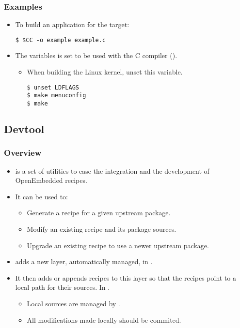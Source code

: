\begin{frame}[fragile]
  \frametitle{Examples}
  \begin{itemize}
    \item To build an application for the target:
      \begin{block}{}
        \begin{verbatim}
$ $CC -o example example.c
        \end{verbatim}
      \end{block}
    \item The  variables is set to be used with the C
      compiler ().
      \begin{itemize}
        \item When building the Linux kernel, unset this variable.
          \begin{block}{}
            \begin{verbatim}
$ unset LDFLAGS
$ make menuconfig
$ make
            \end{verbatim}
          \end{block}
      \end{itemize}
  \end{itemize}
\end{frame}

\subsection{Devtool}

\begin{frame}
  \frametitle{Overview}
  \begin{itemize}
    \item {} is a set of utilities to ease the integration
    and the development of OpenEmbedded recipes.
    \item It can be used to:
      \begin{itemize}
        \item Generate a recipe for a given upstream package.
        \item Modify an existing recipe and its package sources.
        \item Upgrade an existing recipe to use a newer upstream
          package.
      \end{itemize}
    \item {} adds a new layer, automatically managed, in
      .
    \item It then adds or appends recipes to this layer so that the
      recipes point to a local path for their sources. In
      .
      \begin{itemize}
        \item Local sources are managed by .
        \item All modifications made locally should be commited.
      \end{itemize}
  \end{itemize}
\end{frame}

